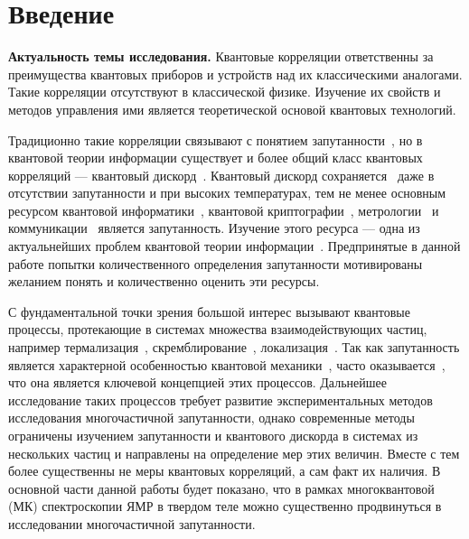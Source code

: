 \chapter*{Введение}


\textbf{Актуальность темы исследования.}
Квантовые корреляции ответственны за преимущества квантовых приборов и устройств над их классическими аналогами.
Такие корреляции отсутствуют в классической физике.
Изучение их свойств и методов управления ими является теоретической основой квантовых технологий.

Традиционно такие корреляции связывают с понятием запутанности~\cite{Einstein1935},
но в квантовой теории информации существует и более общий класс квантовых корреляций --- квантовый дискорд~\cite{Bera2017}.
Квантовый дискорд сохраняется~\cite{Yurishchev2011} даже в отсутствии запутанности и при высоких температурах,
тем не менее основным ресурсом
квантовой информатики~\cite{Arute2019},
квантовой криптографии~\cite{Gisin2002},
метрологии~\cite{Toth2012}
и коммуникации~\cite{Yin2017}
является запутанность.
Изучение этого ресурса --- одна из актуальнейших проблем квантовой теории информации~\cite{Nielsen2000}.
Предпринятые в данной работе попытки количественного определения запутанности мотивированы
желанием понять и количественно оценить эти ресурсы.


С фундаментальной точки зрения большой интерес вызывают квантовые процессы,
протекающие в системах множества взаимодействующих частиц,
например термализация~\cite{DAlessio2016}, скремблирование~\cite{Hosur2016},  локализация~\cite{Alvarez2010}.
Так как запутанность является характерной особенностью квантовой механики~\cite{Schrodinger1935},
часто оказывается~\cite{Kaufman2016, Neill2016, Garttner2018},
что она является ключевой концепцией этих процессов.
Дальнейшее исследование таких процессов
требует развитие экспериментальных методов исследования многочастичной запутанности,
однако современные методы~\cite{Horodecki2009} ограничены изучением запутанности
и квантового дискорда в системах из нескольких частиц
и направлены на определение мер этих величин.
Вместе с тем более существенны не меры квантовых корреляций,
а сам факт их наличия.
В основной части данной работы будет показано,
что в рамках многоквантовой (МК) спектроскопии ЯМР в твердом теле можно существенно продвинуться в исследовании многочастичной запутанности.

